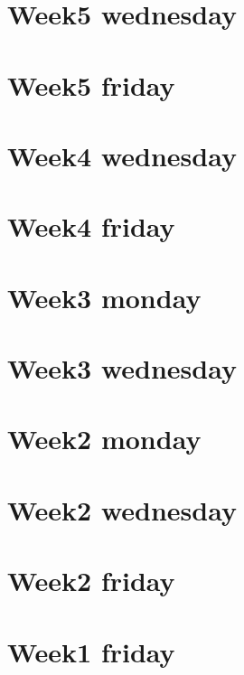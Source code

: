 
\section*{Week5 wednesday}

\vfill
\section*{Week5 friday}

\vfill
\section*{Week4 wednesday}

\vfill
\section*{Week4 friday}

\vfill
\section*{Week3 monday}

\vfill
\section*{Week3 wednesday}

\vfill
\section*{Week2 monday}

\vfill
\section*{Week2 wednesday}

\vfill
\section*{Week2 friday}

\vfill
\section*{Week1 friday}

\vfill
